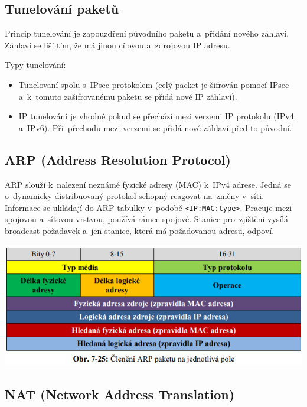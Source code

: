 \subsection{Tunelování paketů}

Princip tunelování je zapouzdření původního paketu a~přidání nového záhlaví. Záhlaví se liší tím, že má jinou cílovou a~zdrojovou IP adresu.

Typy tunelování:
\begin{itemize}[noitemsep]
    \item Tunelovaní spolu s~IPsec protokolem (celý packet je šifrován pomocí IPsec a~k~tomuto zašifrovanému paketu se přidá nové IP záhlaví).
    \item IP tunelování je vhodné pokud se přechází mezi verzemi IP protokolu (IPv4 a~IPv6). Při~přechodu mezi verzemi se přidá nové záhlaví před to původní.
\end{itemize}

\subsection{ARP (Address Resolution Protocol)}

ARP slouží k~nalezení neznámé fyzické adresy (MAC) k~IPv4 adrese. Jedná se o~dynamicky distribuovaný protokol schopný reagovat na~změny v~síti. Informace se ukládají do ARP tabulky v~podobě \texttt{<IP:MAC:type>}. Pracuje mezi spojovou a~sítovou vrstvou, používá rámce spojové. Stanice pro~zjištění vysílá broadcast požadavek a~jen stanice, která má požadovanou adresu, odpoví.

\begin{center}
	\includegraphics[scale=0.5]{images/-038.png}
\end{center}

\subsection{NAT (Network Address Translation)}


